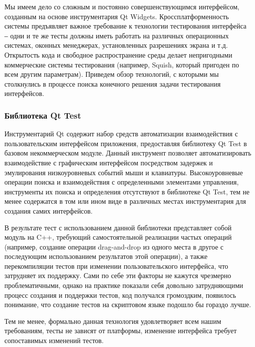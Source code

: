 ﻿\documentclass[conference]{IEEEtran}
\begin{document}
Мы имеем дело со сложным и постоянно совершенствующимся интерфейсом, созданным на 
основе инструментария Qt Widgets. Кроссплатформенность системы предъявляет важное 
требование к технологии тестирования интерфейса ‒ одни и те же тесты должны иметь 
работать на различных операционных системах, оконных менеджерах, установленных разрешениях 
экрана и т.д. Открытость кода и свободное распространение среды делает непригодными 
коммерческие системы тестирования (например, Squish, который пригоден по всем другим 
параметрам). Приведем обзор технологий, с которыми мы столкнулись в процессе поиска 
конечного решения задачи тестирования интерфейсов.

\subsubsection{Библиотека Qt Test}
Инструментарий Qt содержит набор средств автоматизации взаимодействия с пользовательским 
интерфейсом приложения, предоставляя библиотеку Qt Test в базовом некоммерческом модуле. 
Данный инструмент позволяет автоматизировать взаимодействие с графическим интерфейсом 
посредством задержек и эмулирования низкоуровневых событий мыши и клавиатуры. Высокоуровневые 
операции поиска и взаимодействия с определенными элементами управления, инструменты 
их поиска и определения отсутствуют в библиотеке Qt Test, тем не менее содержатся 
в том или ином виде в различных местах инструментария для создания самих интерфейсов. 

В результате тест с использованием данной библиотеки представляет собой модуль на 
C++, требующий самостоятельной реализации частых операций (например, создание операции 
drag-and-drop из одного места в другое с последующим использованием результатов этой 
операции), а также перекомпиляции тестов при изменении пользовательского интерфейса, 
что затрудняет их поддержку. Сами по себе эти факторы не кажутся чрезмерно проблематичными, 
однако на практике показали себя довольно затрудняющими процесс создания и поддержки 
тестов, код получался громоздким, появилось понимание, что создание тестов на скриптовом 
языке подошло бы гораздо лучше.

Тем не менее, формально данная технология удовлетворяет всем нашим требованиям, тесты 
не зависят от платформы, изменение интерфейса требует сопоставимых изменений тестов.
\end{document}
